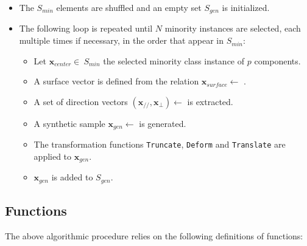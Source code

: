 \documentclass[parskip=full]{scrartcl}
\begin{document}
\begin{itemize}
	
\renewcommand\labelitemi{--}

 \item The \( S_{min} \) elements are shuffled and an empty set \( S_{gen} \) is
 initialized. 
 
 \item The following loop is repeated until \( N \) minority instances are
 selected, each multiple times if necessary, in the order that appear in
 \(S_{min} \):
 
 	\begin{itemize}
 		
 		 \item Let \( \textbf{x}_{center} \in \ S_{min} \) the selected minority
 		 class instance of \( p \) components.
 		 
 		 \item A surface vector is defined from the relation \(
 		 \textbf{x}_{surface} \leftarrow \)  .
 		 
 		 \item A set of direction vectors \( (\textbf{x}_{\scriptscriptstyle//},
 		 \textbf{x}_{\bot}) \leftarrow \)   is extracted.
 		 
 		 \item A synthetic sample \( \textbf{x}_{gen} \leftarrow \) \Hyperball{}
 		 is generated.
 		 
 		 \item The transformation functions  \texttt{Truncate}, \texttt{Deform}
 		 and \texttt{Translate} are applied to \( \textbf{x}_{gen} \).
 		 
 		 \item \( \textbf{x}_{gen} \) is added to \( S_{gen} \).
 		
 	\end{itemize}

\end{itemize}

\subsection{Functions}

The above algorithmic procedure relies on the following definitions of
functions:
\end{document}
